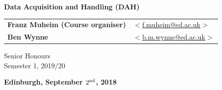 \vspace{1cm}

\begin{center}
\end{center}

\vspace{1cm}

\begin{center}
{\LARGE\bf Data Acquisition and Handling (DAH)}
\end{center}

\begin{center}

\vspace{2cm}

\begin{tabular}{ll}
{\Large{\bf Franz Muheim (Course organiser)}} & \hspace*{5mm}\href{mailto:f.muheim@ed.ac.uk}{$<$f.muheim@ed.ac.uk$>$} \\
{\Large {\bf Ben Wynne} } & \hspace*{5mm} \href{mailto:b.m.wynne@ed.ac.uk}{$<$b.m.wynne@ed.ac.uk$>$} \\

\end{tabular}

\vspace{2cm}
{\Large Senior Honours} \\
{\Large Semester 1, 2019/20} \\

\vspace{2cm}


{\large\bf Edinburgh, September \boldmath$2^{\rm nd}$, 2018}
\end{center}

\vspace{2cm}


